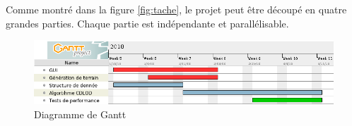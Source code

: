 \documentclass[12pt]{report}
\begin{document}
Comme montré dans la figure \ref{fig:tache}, le projet peut être découpé en quatre grandes parties.
Chaque partie est indépendante et parallélisable.

\begin{center}
\begin{figure}[!h]
  \includegraphics[scale=0.5]{img/gantt.png}
  \caption{Diagramme de Gantt}
  \label{fig:gantt}
\end{figure}
\end{center}

{}

\end{document}
